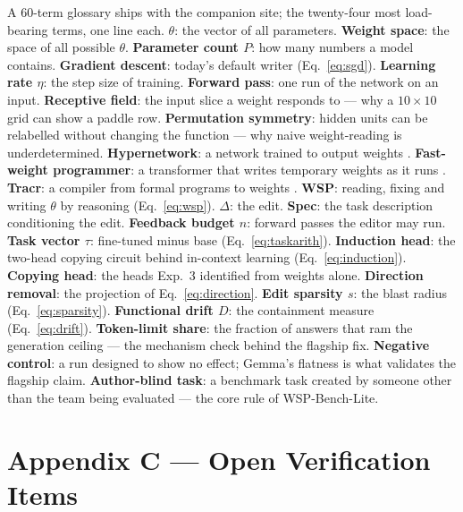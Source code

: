 \documentclass[11pt,a4paper]{article}
\begin{document}
A 60-term glossary ships with the companion site; the twenty-four most load-bearing terms, one line each. \textbf{$\theta$}: the vector of all parameters. \textbf{Weight space}: the space of all possible $\theta$. \textbf{Parameter count $P$}: how many numbers a model contains. \textbf{Gradient descent}: today's default writer (Eq.~\ref{eq:sgd}). \textbf{Learning rate $\eta$}: the step size of training. \textbf{Forward pass}: one run of the network on an input. \textbf{Receptive field}: the input slice a weight responds to --- why a $10{\times}10$ grid can show a paddle row. \textbf{Permutation symmetry}: hidden units can be relabelled without changing the function --- why naive weight-reading is underdetermined. \textbf{Hypernetwork}: a network trained to output weights \cite{ha}. \textbf{Fast-weight programmer}: a transformer that writes temporary weights as it runs \cite{schlag}. \textbf{Tracr}: a compiler from formal programs to weights \cite{tracr}. \textbf{WSP}: reading, fixing and writing $\theta$ by reasoning (Eq.~\ref{eq:wsp}). \textbf{$\Delta$}: the edit. \textbf{Spec}: the task description conditioning the edit. \textbf{Feedback budget $n$}: forward passes the editor may run. \textbf{Task vector $\tau$}: fine-tuned minus base (Eq.~\ref{eq:taskarith}). \textbf{Induction head}: the two-head copying circuit behind in-context learning (Eq.~\ref{eq:induction}). \textbf{Copying head}: the heads Exp.~3 identified from weights alone. \textbf{Direction removal}: the projection of Eq.~\ref{eq:direction}. \textbf{Edit sparsity $s$}: the blast radius (Eq.~\ref{eq:sparsity}). \textbf{Functional drift $D$}: the containment measure (Eq.~\ref{eq:drift}). \textbf{Token-limit share}: the fraction of answers that ram the generation ceiling --- the mechanism check behind the flagship fix. \textbf{Negative control}: a run designed to show no effect; Gemma's flatness is what validates the flagship claim. \textbf{Author-blind task}: a benchmark task created by someone other than the team being evaluated --- the core rule of WSP-Bench-Lite.

\section{Appendix C --- Open Verification Items}\label{app:verify}
\end{document}
